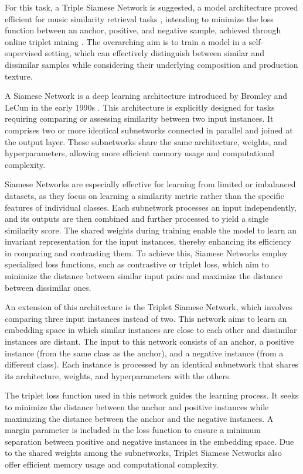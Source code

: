 For this task, a Triple Siamese Network is suggested, a model architecture proved efficient for music similarity retrieval tasks \cite{contentmusicsimtriplet2020}, intending to minimize the loss function between an anchor, positive, and negative sample, achieved through online triplet mining \cite{Sikaroudi2020OfflinePatches}. The overarching aim is to train a model in a self-supervised setting, which can effectively distinguish between similar and dissimilar samples while considering their underlying composition and production texture. 

A Siamese Network is a deep learning architecture introduced by Bromley and LeCun in the early 1990s \cite{Bromley1993SignatureNetwork}. This architecture is explicitly designed for tasks requiring comparing or assessing similarity between two input instances. It comprises two or more identical subnetworks connected in parallel and joined at the output layer. These subnetworks share the same architecture, weights, and hyperparameters, allowing more efficient memory usage and computational complexity.

Siamese Networks are especially effective for learning from limited or imbalanced datasets, as they focus on learning a similarity metric rather than the specific features of individual classes. Each subnetwork processes an input independently, and its outputs are then combined and further processed to yield a single similarity score. The shared weights during training enable the model to learn an invariant representation for the input instances, thereby enhancing its efficiency in comparing and contrasting them. To achieve this, Siamese Networks employ specialized loss functions, such as contrastive or triplet loss, which aim to minimize the distance between similar input pairs and maximize the distance between dissimilar ones.

An extension of this architecture is the Triplet Siamese Network, which involves comparing three input instances instead of two. This network aims to learn an embedding space in which similar instances are close to each other and dissimilar instances are distant. The input to this network consists of an anchor, a positive instance (from the same class as the anchor), and a negative instance (from a different class). Each instance is processed by an identical subnetwork that shares its architecture, weights, and hyperparameters with the others.

The triplet loss function used in this network guides the learning process. It seeks to minimize the distance between the anchor and positive instances while maximizing the distance between the anchor and the negative instances. A margin parameter is included in the loss function to ensure a minimum separation between positive and negative instances in the embedding space. Due to the shared weights among the subnetworks, Triplet Siamese Networks also offer efficient memory usage and computational complexity.

